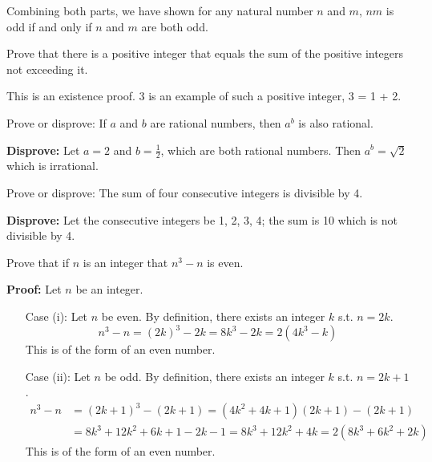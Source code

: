 \begin{questions}
\begin{solution}
    \smallskip
    Combining both parts, we have shown for any natural number $n$ and $m$, $nm$ is odd if and only if $n$ and $m$ are both odd.
\end{solution}









 Prove that there is a positive integer that equals the
sum of the positive integers not exceeding it.
    \ifprintanswers
        \vspace{-10pt}
    \fi
\begin{solution}
    This is an existence proof.  3 is an example of such a positive
    integer, 3 = 1 + 2.
\end{solution}


 Prove or disprove: If $a$ and $b$ are rational
numbers, then $a^b$ is also rational.
    \ifprintanswers
        \vspace{-10pt}
    \fi
\begin{solution}
    \textbf{Disprove:} Let $a=2$ and $b=\frac{1}{2}$, which are both rational numbers.  Then $a^b =
    \sqrt{2}$ which is irrational.
\end{solution}


 Prove or disprove: The sum of four consecutive integers is divisible by 4.
    \ifprintanswers
        \vspace{-10pt}
    \fi
\begin{solution}
    \textbf{Disprove:} Let the consecutive integers be 1, 2, 3, 4; the sum is 10 which is not divisible by 4.
\end{solution}




 Prove that if $n$ is an integer that $n^3 - n$ is even.
    \ifprintanswers
        \vspace{-10pt}
    \fi
\begin{solution} \textbf{Proof:} Let $n$ be an integer.
    \begin{itemize}[itemsep=0pt,parsep=0pt,topsep=0pt,partopsep=0pt]
        \item[Case] (i): Let $n$ be even. By definition, there exists an integer $k$ s.t. $n=2k$.
            \[ n^3 - n = (2k)^3 - 2k = 8k^3 - 2k = 2(4k^3 - k) \]
        This is of the form of an even number.
        \item[Case] (ii):  Let $n$ be odd.  By definition, there exists an integer $k$ s.t. $n = 2k+1$.
            \begin{align*}
                n^3 - n &= (2k+1)^3 - (2k+1) = (4k^2 + 4k+ 1)(2k + 1) - (2k+1) \\
                &= 8k^3 + 12k^2 + 6k + 1 - 2k - 1 = 8k^3 + 12k^2 + 4k = 2(8k^3 + 6k^2 + 2k)
            \end{align*}
        This is of the form of an even number.


\end{itemize}
\end{solution}
\end{questions}
